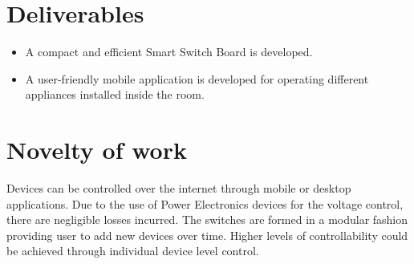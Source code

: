         \section{Deliverables}
        	\begin{itemize}
        		\item A compact and efficient Smart Switch Board is developed.

                 \item A user-friendly mobile application is developed for operating different appliances installed inside the room.
        	\end{itemize}
        \section{Novelty of work}
        Devices can be controlled over the internet through mobile or desktop applications. Due to the use of Power Electronics devices for the voltage control, there are negligible losses incurred. The switches are formed in a modular fashion providing user to add new devices over time. Higher levels of controllability could be achieved through individual device level control.	
    